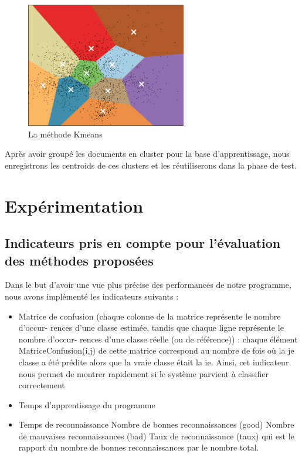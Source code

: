 \documentclass[french,12pt,a4paper,oneside,notitlepage]{report}
\begin{document}
\begin{figure}[ht]
	\begin{center}
	  \includegraphics[width=7cm]{kmeans.png}
	\end{center}
	 \caption{La méthode Kmeans}
\end{figure}

Après avoir groupé les documents en cluster pour la base d'apprentissage, nous enregistrons les centroids de ces clusters et les réutiliserons dans la phase de test.

\section{Expérimentation}
\subsection{Indicateurs pris en compte pour l’évaluation des méthodes proposées}

Dans le but d’avoir une vue plus précise des performances de notre programme, nous
avons implémenté les indicateurs suivants :
\begin{itemize}
\item Matrice de confusion (chaque colonne de la matrice représente le nombre d’occur-
rences d’une classe estimée, tandis que chaque ligne représente le nombre d’occur-
rences d’une classe réelle (ou de référence)) : chaque élément MatriceConfusion(i,j)
de cette matrice correspond au nombre de fois où la je classe a été prédite alors que la
vraie classe était la ie. Ainsi, cet indicateur nous permet de montrer rapidement si le
système parvient à classifier correctement
\item Temps d’apprentissage du programme
\item Temps de reconnaissance Nombre de bonnes reconnaissances (good) Nombre de
mauvaises reconnaissances (bad) Taux de reconnaissance (taux) qui est le rapport
du nombre de bonnes reconnaissances par le nombre total.

\end{itemize}
\end{document}
